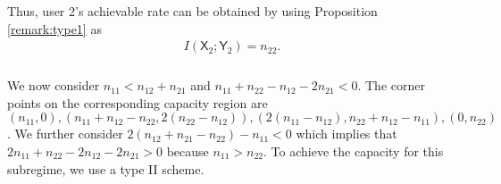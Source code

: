 \documentclass[12pt, draftclsnofoot, onecolumn]{IEEEtran}
\newcommand{\msf}[1]{\mathsf{#1}}
\theoremstyle{definition}
\begin{document}
Thus, user 2's achievable rate can be obtained by using Proposition \ref{remark:type1} as
\begin{align}
I(\msf{X}_2;\msf{Y}_2) = n_{22}.
\end{align}





\subsubsection{}\label{sec:weak_12_example}
We now consider $n_{11}<n_{12}+n_{21}$ and $n_{11}+n_{22} - n_{12} - 2n_{21}<0$. The corner points on the corresponding capacity region are $(n_{11},0),(n_{11}+n_{12} - n_{22},2(n_{22}-n_{12})),(2(n_{11}-n_{12}),n_{22}+n_{12}-n_{11}),(0,n_{22})$. We further consider $2(n_{12}+n_{21}-n_{22})-n_{11}<0$ which implies that $2n_{11}+n_{22}-2n_{12}-2n_{21}>0$ because $n_{11}>n_{22}$. To achieve the capacity for this subregime, we use a type II scheme.
\end{document}
